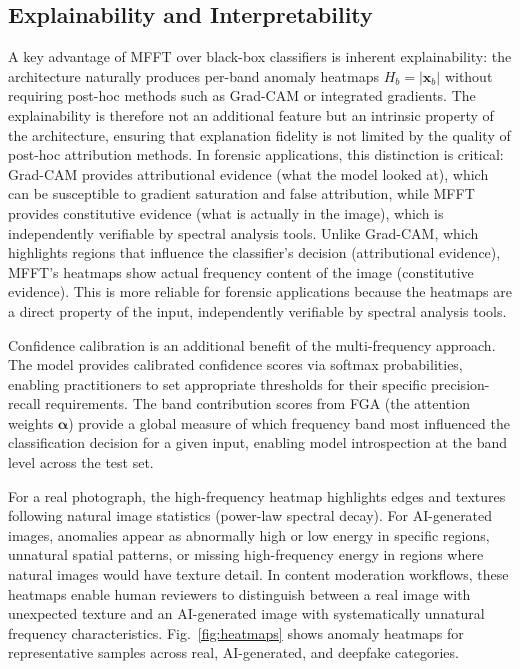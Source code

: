 \documentclass[journal]{IEEEtran}
\begin{document}
\subsection{Explainability and Interpretability}
A key advantage of MFFT over black-box classifiers is inherent explainability: the architecture naturally produces per-band anomaly heatmaps $H_b = |\mathbf{x}_b|$ without requiring post-hoc methods such as Grad-CAM or integrated gradients. The explainability is therefore not an additional feature but an intrinsic property of the architecture, ensuring that explanation fidelity is not limited by the quality of post-hoc attribution methods. In forensic applications, this distinction is critical: Grad-CAM provides attributional evidence (what the model looked at), which can be susceptible to gradient saturation and false attribution, while MFFT provides constitutive evidence (what is actually in the image), which is independently verifiable by spectral analysis tools. Unlike Grad-CAM, which highlights regions that influence the classifier's decision (attributional evidence), MFFT's heatmaps show actual frequency content of the image (constitutive evidence). This is more reliable for forensic applications because the heatmaps are a direct property of the input, independently verifiable by spectral analysis tools.

Confidence calibration is an additional benefit of the multi-frequency approach. The model provides calibrated confidence scores via softmax probabilities, enabling practitioners to set appropriate thresholds for their specific precision-recall requirements. The band contribution scores from FGA (the attention weights $\boldsymbol{\alpha}$) provide a global measure of which frequency band most influenced the classification decision for a given input, enabling model introspection at the band level across the test set.

For a real photograph, the high-frequency heatmap highlights edges and textures following natural image statistics (power-law spectral decay). For AI-generated images, anomalies appear as abnormally high or low energy in specific regions, unnatural spatial patterns, or missing high-frequency energy in regions where natural images would have texture detail. In content moderation workflows, these heatmaps enable human reviewers to distinguish between a real image with unexpected texture and an AI-generated image with systematically unnatural frequency characteristics. Fig.~\ref{fig:heatmaps} shows anomaly heatmaps for representative samples across real, AI-generated, and deepfake categories.
\end{document}
